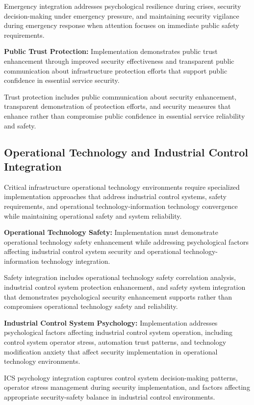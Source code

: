 \documentclass[10pt, twocolumn]{article}
\begin{document}
Emergency integration addresses psychological resilience during crises, security decision-making under emergency pressure, and maintaining security vigilance during emergency response when attention focuses on immediate public safety requirements.

\textbf{Public Trust Protection:} Implementation demonstrates public trust enhancement through improved security effectiveness and transparent public communication about infrastructure protection efforts that support public confidence in essential service security.

Trust protection includes public communication about security enhancement, transparent demonstration of protection efforts, and security measures that enhance rather than compromise public confidence in essential service reliability and safety.

\subsection{Operational Technology and Industrial Control Integration}

Critical infrastructure operational technology environments require specialized implementation approaches that address industrial control systems, safety requirements, and operational technology-information technology convergence while maintaining operational safety and system reliability.

\textbf{Operational Technology Safety:} Implementation must demonstrate operational technology safety enhancement while addressing psychological factors affecting industrial control system security and operational technology-information technology integration.

Safety integration includes operational technology safety correlation analysis, industrial control system protection enhancement, and safety system integration that demonstrates psychological security enhancement supports rather than compromises operational technology safety and reliability.

\textbf{Industrial Control System Psychology:} Implementation addresses psychological factors affecting industrial control system operation, including control system operator stress, automation trust patterns, and technology modification anxiety that affect security implementation in operational technology environments.

ICS psychology integration captures control system decision-making patterns, operator stress management during security implementation, and factors affecting appropriate security-safety balance in industrial control environments.
\end{document}
